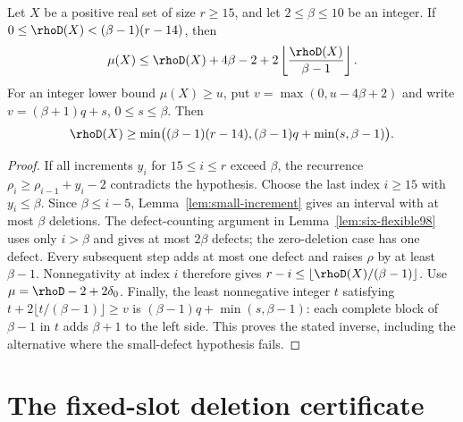 \begin{lemma}\label{lem:flex96}
Let $X$ be a positive real set of size $r\geq15$, and let
$2\leq\beta\leq10$ be an integer. If
$0\leq\rhoD(X)<(\beta-1)(r-14)$, then
\[
 \mu(X)\leq\rhoD(X)+4\beta-2+
                    2\left\lfloor\frac{\rhoD(X)}{\beta-1}\right\rfloor.
\]
For an integer lower bound $\mu(X)\geq u$, put
$v=\max(0,u-4\beta+2)$ and write $v=(\beta+1)q+s$, $0\leq s\leq\beta$.
Then
\begin{equation}
 \rhoD(X)\geq\min\bigl((\beta-1)(r-14),
                  (\beta-1)q+\min(s,\beta-1)\bigr).
 \label{eq:flex96-inverse}
\end{equation}
\end{lemma}
\begin{proof}
If all increments $y_i$ for $15\leq i\leq r$ exceed $\beta$, the
recurrence $\rho_i\geq\rho_{i-1}+y_i-2$ contradicts the hypothesis.
Choose the last index $i\geq15$ with $y_i\leq\beta$.
Since $\beta\leq i-5$, Lemma~\ref{lem:small-increment} gives an interval
with at most $\beta$ deletions. The defect-counting argument in
Lemma~\ref{lem:six-flexible98} uses only $i>\beta$ and gives at most
$2\beta$ defects; the zero-deletion case has one defect.
Every subsequent step adds at most one defect and raises $\rho$ by at
least $\beta-1$. Nonnegativity at index $i$ therefore gives
$r-i\leq\lfloor\rhoD(X)/(\beta-1)\rfloor$. Use
$\mu=\rhoD-2+2\delta_0$.
Finally, the least nonnegative integer $t$ satisfying
$t+2\lfloor t/(\beta-1)\rfloor\geq v$ is
$(\beta-1)q+\min(s,\beta-1)$: each complete block of $\beta-1$ in $t$
adds $\beta+1$ to the left side. This proves the stated inverse, including
the alternative where the small-defect hypothesis fails.
\end{proof}

\section{The fixed-slot deletion certificate}\label{app:slots}

